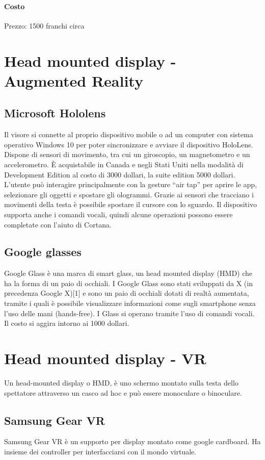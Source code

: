 \documentclass[8pt]{extarticle}
\begin{document}
\begin{multicols}{3}
\paragraph{Costo}
Prezzo: 1500 franchi circa
\section{Head mounted display - Augmented Reality}
\subsection{Microsoft Hololens}
Il visore si connette al proprio dispositivo mobile o ad un computer con sistema operativo Windows 10 per poter sincronizzare e avviare il dispositivo HoloLens.
Dispone di sensori di movimento, tra cui un giroscopio, un magnetometro e un accelerometro.
È acquistabile in Canada e negli Stati Uniti nella modalità di Development Edition al costo di 3000 dollari, la suite edition 5000 dollari.
L’utente può interagire principalmente con la gesture “air tap” per aprire le app, selezionare gli oggetti e spostare gli ologrammi. Grazie ai sensori che tracciano i movimenti della testa è possibile spostare il cursore con lo sguardo. Il dispositivo supporta anche i comandi vocali, quindi alcune operazioni possono essere completate con l’aiuto di Cortana.
\subsection{Google glasses}
Google Glass è una marca di smart glass, un head mounted display (HMD) che ha la forma di un paio di occhiali. I Google Glass sono stati sviluppati da X (in precedenza Google X)[1] e sono un paio di occhiali dotati di realtà aumentata, tramite i quali è possibile visualizzare informazioni come sugli smartphone senza l'uso delle mani (hands-free). I Glass si operano tramite l'uso di comandi vocali.
Il costo si aggira intorno ai 1000 dollari.

\section{Head mounted display - VR}
Un head-mounted display o HMD, è uno schermo montato sulla testa dello spettatore attraverso un casco ad hoc e può essere monoculare o binoculare.
\subsection{Samsung Gear VR}
Samsung Gear VR è un supporto per display montato come google cardboard.
Ha insieme dei controller per interfacciarsi con il mondo virtuale.

\end{multicols}
\end{document}
